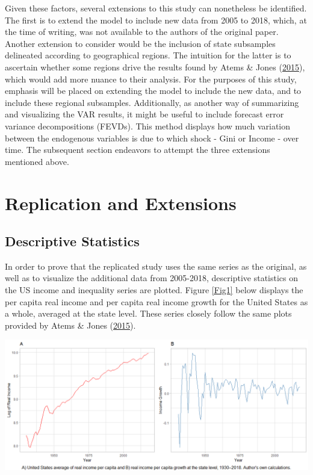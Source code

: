 \documentclass[11pt,preprint, authoryear]{elsarticle}
\let\origfigure\figure
\let\endorigfigure\endfigure
\renewenvironment{figure}[1][2] {
    \expandafter\origfigure\expandafter[H]
} {
    \endorigfigure
}
\numberwithin{equation}{section}
\numberwithin{figure}{section}
\numberwithin{table}{section}
\begin{document}
Given these factors, several extensions to this study can nonetheless be
identified. The first is to extend the model to include new data from
2005 to 2018, which, at the time of writing, was not available to the
authors of the original paper. Another extension to consider would be
the inclusion of state subsamples delineated according to geographical
regions. The intuition for the latter is to ascertain whether some
regions drive the results found by Atems \& Jones
(\protect\hyperlink{ref-atems}{2015}), which would add more nuance to
their analysis. For the purposes of this study, emphasis will be placed
on extending the model to include the new data, and to include these
regional subsamples. Additionally, as another way of summarizing and
visualizing the VAR results, it might be useful to include forecast
error variance decompositions (FEVDs). This method displays how much
variation between the endogenous variables is due to which shock - Gini
or Income - over time. The subsequent section endeavors to attempt the
three extensions mentioned above.

\newpage

\hypertarget{replication-and-extensions}{%
\section{\texorpdfstring{Replication and Extensions
\label{Section 3}}{Replication and Extensions }}\label{replication-and-extensions}}

\hypertarget{descriptive-statistics}{%
\subsection{\texorpdfstring{Descriptive Statistics
\label{Section 3.1}}{Descriptive Statistics }}\label{descriptive-statistics}}

In order to prove that the replicated study uses the same series as the
original, as well as to visualize the additional data from 2005-2018,
descriptive statistics on the US income and inequality series are
plotted. Figure \ref{Fig1} below displays the per capita real income and
per capita real income growth for the United States as a whole, averaged
at the state level. These series closely follow the same plots provided
by Atems \& Jones (\protect\hyperlink{ref-atems}{2015}).

\begin{figure}[H]
\includegraphics[width=1\linewidth]{images/Fig1_US_Income_gridplot} \caption{\label{Fig1}}\label{fig:Fig1}
\end{figure}
\end{document}
